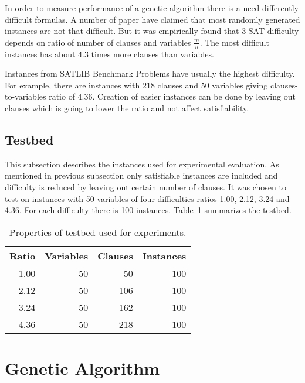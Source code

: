 \documentclass{article}
\begin{document}
In order to measure performance of a genetic algorithm
there is a need differently difficult formulas.
A number of paper have claimed that most randomly generated instances are
not that difficult.
But it was empirically found that 3-SAT difficulty depends on ratio of
number of clauses and variables $\frac{m}{n}$.
The most difficult instances has about 4.3 times more clauses than variables.
\cite{selman1996}

Instances from SATLIB Benchmark Problems have usually the highest difficulty.
For example, there are instances with 218 clauses and 50 variables
giving clauses-to-variables ratio of 4.36.
Creation of easier instances can be done by leaving out clauses
which is going to lower the ratio and not affect satisfiability.

\subsection{Testbed}

This subsection describes the instances used for experimental evaluation.
As mentioned in previous subsection only satisfiable instances are included
and difficulty is reduced by leaving out certain number of clauses.
It was chosen to test on instances with 50 variables of four difficulties ratios
1.00, 2.12, 3.24 and 4.36.
For each difficulty there is 100 instances.
Table~\ref{testbed-table} summarizes the testbed.

\begin{table}[ht]
\caption{Properties of testbed used for experiments.}
\label{testbed-table}
\vskip 0.15in
\begin{center}
\begin{small}
\begin{sc}
\begin{tabular}{rrrr}
\toprule
Ratio & Variables & Clauses & Instances \\
\midrule
1.00 & 50 & 50  & 100 \\
2.12 & 50 & 106 & 100 \\
3.24 & 50 & 162 & 100 \\
4.36 & 50 & 218 & 100 \\
\bottomrule
\end{tabular}
\end{sc}
\end{small}
\end{center}
\vskip -0.1in
\end{table}

\section{Genetic Algorithm}
\end{document}
